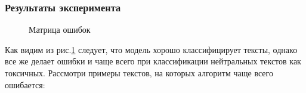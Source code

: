 \subsubsection{Результаты эксперимента}
\begin{figure}[h]
	\caption{\centering Матрица ошибок}
	\label{eq:confm}
\end{figure}
Как видим из рис.\ref{eq:confm} следует, что модель хорошо классифицирует
тексты, однако все же делает ошибки и чаще всего при классификации нейтральных текстов как токсичных. Рассмотри примеры текстов, на которых алгоритм чаще всего ошибается:\\
